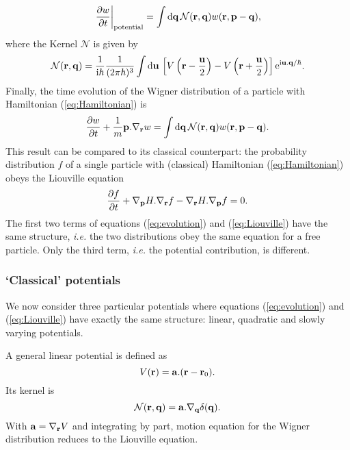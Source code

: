 \begin{equation}
	\label{eq:potentialEvolution}
	\left.\frac{\partial w}{\partial t}\right|_{\text{potential}} =
	\int \mathrm{d}\mathbf{ q } \, \mathcal{N}(\mathbf{ r },\mathbf{ q }) w(\mathbf{ r }, \mathbf{ p }-\mathbf{ q }) ,
\end{equation}
where the Kernel $\mathcal{N}$ is given by
\begin{equation}
	\label{eq:kernel}
	\mathcal{N}(\mathbf{ r },\mathbf{ q }) =
	\frac{1}{\mathrm{i}\hbar} \frac{1}{(2\pi\hbar)^3} \int \mathrm{d}\mathbf{ u } \, \left[ V\left(\mathbf{ r }-\frac{\mathbf{ u }}{2}\right) - V\left( \mathbf{ r } + \frac{\mathbf{ u }}{2} \right) \right] \mathrm{e}^{\mathrm{i} \mathbf{ u }.\mathbf{ q }/\hbar } .
\end{equation}
Finally, the time evolution of the Wigner distribution of a particle with Hamiltonian (\ref{eq:Hamiltonian}) is
\begin{equation}
	\label{eq:evolution}
	\frac{\partial w}{\partial t} + \frac{1}{m} \mathbf{ p }.\nabla_{\mathbf{ r }} w =
	\int \mathrm{d}\mathbf{ q } \, \mathcal{N}(\mathbf{ r },\mathbf{ q }) w(\mathbf{ r }, \mathbf{ p }-\mathbf{ q }) .
\end{equation}
This result can be compared to its classical counterpart: the probability distribution $f$ of a single particle with (classical) Hamiltonian (\ref{eq:Hamiltonian}) obeys the Liouville equation
\begin{equation}
	\label{eq:Liouville}
	\frac{\partial f}{\partial t} + \nabla_{\mathbf{ p }} H . \nabla_{\mathbf{ r }} f - \nabla_{\mathbf{ r }} H . \nabla_{\mathbf{ p }} f = 0 .
\end{equation}
The first two terms of equations (\ref{eq:evolution}) and (\ref{eq:Liouville}) have the same structure, \textit{i.e.} the two distributions obey the same equation for a free particle. Only the third term, \textit{i.e.} the potential contribution, is different.


\subsubsection{`Classical' potentials}

We now consider three particular potentials where equations (\ref{eq:evolution}) and (\ref{eq:Liouville}) have exactly the same structure: linear, quadratic and slowly varying potentials.

A general linear potential is defined as
\begin{equation}
	V(\mathbf{ r }) = \mathbf{ a }.(\mathbf{ r }-\mathbf{ r }_0) .
	\nonumber
\end{equation}
Its kernel is
\begin{equation}
	\label{eq:linearKernel}
	\mathcal{N}(\mathbf{ r },\mathbf{ q }) =
	\mathbf{ a }.\nabla_{\mathbf{ q }} \delta(\mathbf{ q }) .
\end{equation}
With $\mathbf{ a } = \nabla_{\mathbf{ r }}V$ and integrating by part, motion equation for the Wigner distribution reduces to the Liouville equation.

